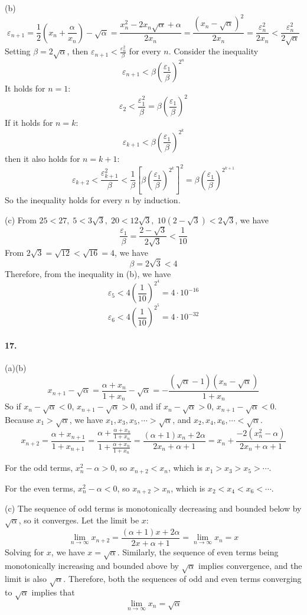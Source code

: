 \documentclass[a4paper]{article}
\begin{document}
(b)
\[
\varepsilon_{n+1}=\frac{1}{2}\left(x_n+\frac{\alpha}{x_n} \right)-\sqrt{\alpha}=\frac{x_n^2-2x_n\sqrt{\alpha}+\alpha}{2x_n}=\frac{(x_n-\sqrt{\alpha})^2}{2x_n}=\frac{\varepsilon_n^2}{2x_n}<\frac{\varepsilon_n^2}{2\sqrt{\alpha}}
\]
Setting $\beta=2\sqrt{\alpha}$, then $\varepsilon_{n+1}<\frac{\varepsilon_n^2}{\beta}$ for every $n$. Consider the inequality 
\[\varepsilon_{n+1}<\beta\left(\frac{\varepsilon_1}{\beta} \right)^{2^n}
\]
It holds for $n=1$:
\[
\varepsilon_2<\frac{\varepsilon_1^2}{\beta}=\beta\left(\frac{\varepsilon_1}{\beta} \right)^2
\]
If it holds for $n=k$:
\[
\varepsilon_{k+1}<\beta\left(\frac{\varepsilon_1}{\beta} \right)^{2^k}
\]
then it also holds for $n=k+1$:
\[
\varepsilon_{k+2}<\frac{\varepsilon_{k+1}^2}{\beta}<\frac{1}{\beta}\left[\beta\left(\frac{\varepsilon_1}{\beta} \right)^{2^k} \right]^2=\beta\left(\frac{\varepsilon_1}{\beta} \right)^{2^{k+1}}
\]
So the inequality holds for every $n$ by induction.
\medskip

(c)
From $25<27,\;5<3\sqrt{3},\;20<12\sqrt{3},\;10(2-\sqrt{3})<2\sqrt{3}$, we have
\[
\frac{\varepsilon_1}{\beta}=\frac{
2-\sqrt{3}}{2\sqrt{3}}<\frac{1}{10}
\]
From $2\sqrt{3}=\sqrt{12}<\sqrt{16}=4$, we have
\[
\beta=2\sqrt{3}<4
\]
Therefore, from the inequality in (b), we have
\[
\varepsilon_5<4\left(\frac{1}{10} \right)^{2^4}=4\cdot10^{-16}
\]
\[
\varepsilon_6<4\left(\frac{1}{10} \right)^{2^5}=4\cdot10^{-32}
\]

\paragraph{17.}
(a)(b)
\[
x_{n+1}-\sqrt{\alpha}=\frac{\alpha+x_n}{1+x_n}-\sqrt{\alpha}=-\frac{(\sqrt{\alpha}-1)(x_n-\sqrt{\alpha})}{1+x_n}
\]
So if $x_{n}-\sqrt{\alpha}<0$,\; $x_{n+1}-\sqrt{\alpha}>0$, and if $x_n-\sqrt{\alpha}>0$,\; $x_{n+1}-\sqrt{\alpha}<0$. Because $x_1>\sqrt{\alpha}$, we have $x_1,x_3,x_5,\cdots>\sqrt{\alpha}$, and $x_2,x_4,x_6,\cdots<\sqrt{\alpha}$.
\[
x_{n+2}=\frac{\alpha+x_{n+1}}{1+x_{n+1}}=\frac{\alpha+\frac{\alpha+x_n}{1+x_n}}{1+\frac{\alpha+x_n}{1+x_n}}=\frac{(\alpha+1)x_n+2\alpha}{2x_n+\alpha+1}=x_n+\frac{-2(x_n^2-\alpha)}{2x_n+\alpha+1}
\]

For the odd terms, $x_n^2-\alpha>0$, so $x_{n+2}<x_n$, which is $x_1>x_3>x_5>\cdots$.

For the even terms, $x_n^2-\alpha<0$, so $x_{n+2}>x_n$, which is $x_2<x_4<x_6<\cdots$.
\medskip

(c)
The sequence of odd terms is monotonically decreasing and bounded below by $\sqrt{\alpha}$, so it converges. Let the limit be $x$:
\[
\lim_{n\to\infty}x_{n+2}=\frac{(\alpha+1)x+2\alpha}{2x+\alpha+1}=\lim_{n\to\infty}x_n=x
\]
Solving for $x$, we have $x=\sqrt{\alpha}$. Similarly, the sequence of even terms being monotonically increasing and bounded above by $\sqrt{\alpha}$ implies convergence, and the limit is also $\sqrt{\alpha}$. Therefore, both the sequences of odd and even terms converging to $\sqrt{\alpha}$ implies that 
\[
\lim_{n\to\infty}x_n=\sqrt{\alpha}
\]
\end{document}
